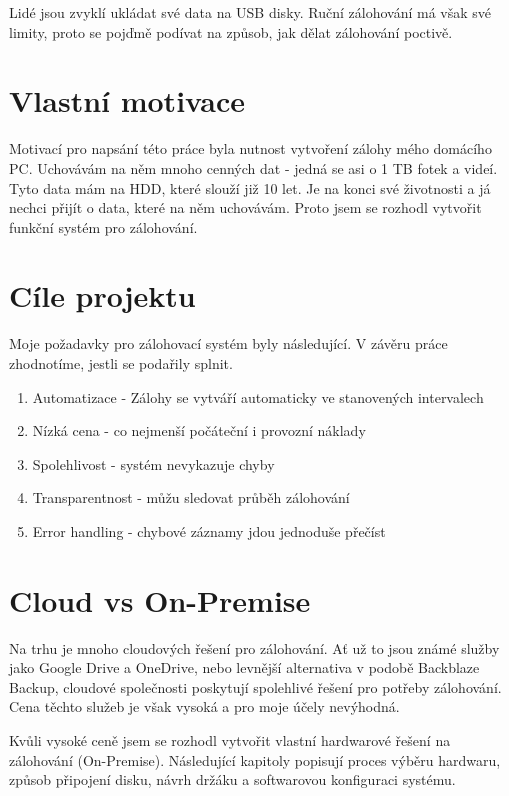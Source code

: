 \documentclass[a4paper,12pt, oneside]{book}
\begin{document}
Lidé jsou zvyklí ukládat své data na USB disky. Ruční zálohování má však své limity,
proto se pojďmě podívat na způsob, jak dělat zálohování poctivě.


\section{Vlastní motivace}

Motivací pro napsání této práce byla nutnost vytvoření zálohy mého
domácího PC. Uchovávám na něm mnoho cenných dat -
jedná se asi o 1 TB fotek a videí. Tyto data mám na HDD, které
slouží již 10 let. Je na konci své životnosti a já nechci přijít o data,
které na něm uchovávám. Proto jsem se rozhodl vytvořit funkční systém 
pro zálohování.

\section{Cíle projektu}

Moje požadavky pro zálohovací systém byly následující. V závěru práce zhodnotíme, 
jestli se podařily splnit.

\begin{enumerate}
	\item Automatizace - Zálohy se vytváří automaticky ve stanovených intervalech
	\item Nízká cena - co nejmenší počáteční i provozní náklady
	\item Spolehlivost - systém nevykazuje chyby
	\item Transparentnost - můžu sledovat průběh zálohování
	\item Error handling - chybové záznamy jdou jednoduše přečíst
\end{enumerate}

\section{Cloud vs On-Premise}

Na trhu je mnoho cloudových řešení pro zálohování. 
Ať už to jsou známé služby jako Google Drive a OneDrive, nebo 
levnější alternativa v podobě Backblaze Backup, cloudové společnosti poskytují 
spolehlivé řešení pro potřeby zálohování. Cena těchto služeb je však vysoká a pro moje účely nevýhodná. 

Kvůli vysoké ceně jsem se rozhodl vytvořit vlastní hardwarové řešení na
zálohování (On-Premise).
Následující kapitoly popisují
proces výběru hardwaru, způsob připojení disku, návrh držáku a softwarovou
konfiguraci systému.
\end{document}
